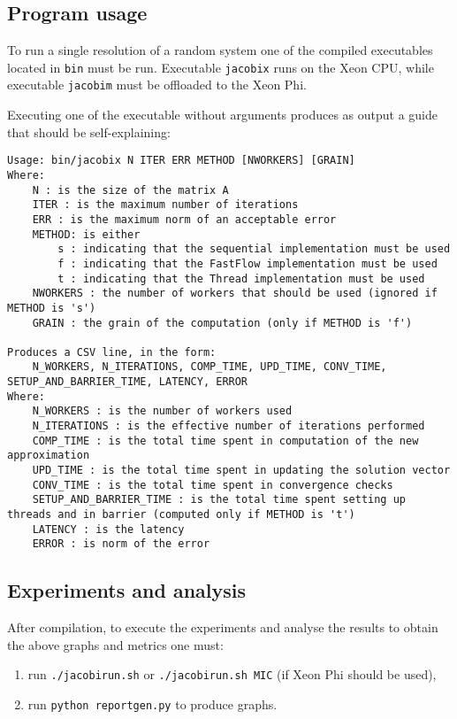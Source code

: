 \subsection{Program usage}
To run a single resolution of a random system one of the compiled executables located in \verb|bin| must be run.
Executable \verb|jacobix| runs on the Xeon CPU, while executable \verb|jacobim| must be offloaded to the Xeon Phi.

Executing one of the executable without arguments produces as output a guide that should be self-explaining:
\begin{lstlisting}
Usage: bin/jacobix N ITER ERR METHOD [NWORKERS] [GRAIN]
Where: 
	N : is the size of the matrix A
	ITER : is the maximum number of iterations
	ERR : is the maximum norm of an acceptable error
	METHOD: is either
		s : indicating that the sequential implementation must be used
		f : indicating that the FastFlow implementation must be used
		t : indicating that the Thread implementation must be used
	NWORKERS : the number of workers that should be used (ignored if METHOD is 's')
	GRAIN : the grain of the computation (only if METHOD is 'f')

Produces a CSV line, in the form:
	N_WORKERS, N_ITERATIONS, COMP_TIME, UPD_TIME, CONV_TIME, SETUP_AND_BARRIER_TIME, LATENCY, ERROR
Where:
	N_WORKERS : is the number of workers used
	N_ITERATIONS : is the effective number of iterations performed
	COMP_TIME : is the total time spent in computation of the new approximation
	UPD_TIME : is the total time spent in updating the solution vector
	CONV_TIME : is the total time spent in convergence checks
	SETUP_AND_BARRIER_TIME : is the total time spent setting up threads and in barrier (computed only if METHOD is 't')
	LATENCY : is the latency
	ERROR : is norm of the error
\end{lstlisting}

\subsection{Experiments and analysis}\label{subsec:runningexperiments}
After compilation, to execute the experiments and analyse the results to obtain the above graphs and metrics one must:
\begin{enumerate}
	\item run \verb|./jacobirun.sh| or \verb|./jacobirun.sh MIC| (if Xeon Phi should be used), 
	\item run \verb|python reportgen.py| to produce graphs.
\end{enumerate}